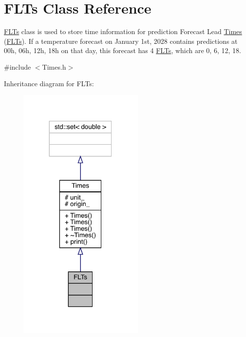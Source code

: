 \hypertarget{class_f_l_ts}{}\section{F\+L\+Ts Class Reference}
\label{class_f_l_ts}


\mbox{\hyperlink{class_f_l_ts}{F\+L\+Ts}} class is used to store time information for prediction Forecast Lead \mbox{\hyperlink{class_times}{Times}} (\mbox{\hyperlink{class_f_l_ts}{F\+L\+Ts}}). If a temperature forecast on January 1st, 2028 contains predictions at 00h, 06h, 12h, 18h on that day, this forecast has 4 \mbox{\hyperlink{class_f_l_ts}{F\+L\+Ts}}, which are 0, 6, 12, 18.  




{\ttfamily \#include $<$Times.\+h$>$}



Inheritance diagram for F\+L\+Ts\+:
\nopagebreak
\begin{figure}[H]
\begin{center}
\leavevmode
\includegraphics[width=176pt]{class_f_l_ts__inherit__graph}
\end{center}
\end{figure}


